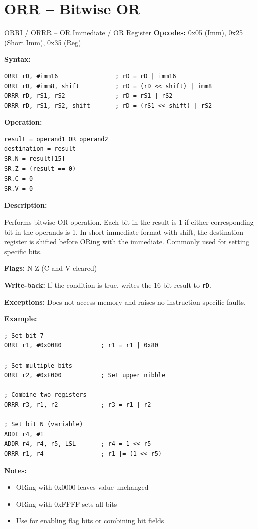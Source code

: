 \section{ORR -- Bitwise OR}

\begin{instructionbox}{ORRI / ORRR -- OR Immediate / OR Register}
	\textbf{Opcodes:} 0x05 (Imm), 0x25 (Short Imm), 0x35 (Reg)

	\textbf{Syntax:}
	\begin{lstlisting}
ORRI rD, #imm16                ; rD = rD | imm16
ORRI rD, #imm8, shift          ; rD = (rD << shift) | imm8
ORRR rD, rS1, rS2              ; rD = rS1 | rS2
ORRR rD, rS1, rS2, shift       ; rD = (rS1 << shift) | rS2
\end{lstlisting}

	\textbf{Operation:}
	\begin{verbatim}
result = operand1 OR operand2
destination = result
SR.N = result[15]
SR.Z = (result == 0)
SR.C = 0
SR.V = 0
\end{verbatim}

	\textbf{Description:}

	Performs bitwise OR operation. Each bit in the result is 1 if either corresponding bit in the operands is 1. In short
	immediate format with shift, the destination register is shifted before ORing with the immediate. Commonly used for
	setting specific bits.

	\textbf{Flags:} N Z (C and V cleared)

	\textbf{Write-back:} If the condition is true, writes the 16-bit result to \texttt{rD}.

	\textbf{Exceptions:} Does not access memory and raises no instruction-specific faults.

	\textbf{Example:}
	\begin{lstlisting}
; Set bit 7
ORRI r1, #0x0080           ; r1 = r1 | 0x80

; Set multiple bits
ORRI r2, #0xF000           ; Set upper nibble

; Combine two registers
ORRR r3, r1, r2            ; r3 = r1 | r2

; Set bit N (variable)
ADDI r4, #1
ADDR r4, r4, r5, LSL       ; r4 = 1 << r5
ORRR r1, r4                ; r1 |= (1 << r5)
\end{lstlisting}

	\textbf{Notes:}
	\begin{itemize}
		\item ORing with 0x0000 leaves value unchanged
		\item ORing with 0xFFFF sets all bits
		\item Use for enabling flag bits or combining bit fields
	\end{itemize}
\end{instructionbox}

